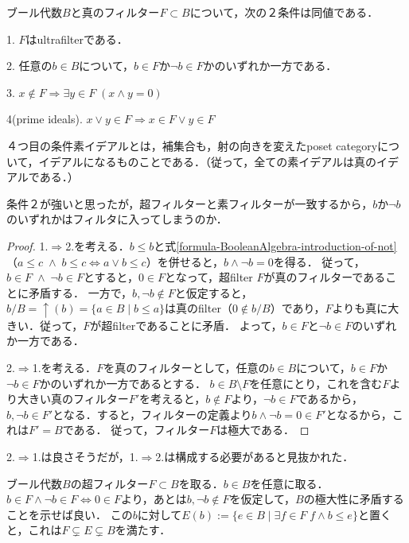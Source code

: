 \documentclass[uplatex, 12pt, dvipdfmx]{jsarticle}
\begin{document}
\begin{proposition*}[ブール代数上のultrafilterの同値な条件]
    ブール代数$B$と真のフィルター$F\subset B$について，次の２条件は同値である．

    1. $F$はultrafilterである．

    2. 任意の$b\in B$について，$b\in F$か$\lnot b\in F$かのいずれか一方である．

    3. $x\notin F\Rightarrow \exists y\in F\; (x\land y=0)$

    4(prime ideals). $x\lor y\in F \Rightarrow x\in F \lor y\in F$
\end{proposition*}
\begin{remark*}
    ４つ目の条件素イデアルとは，補集合も，射の向きを変えたposet categoryについて，イデアルになるものことである．（従って，全ての素イデアルは真のイデアルである．）

    条件２が強いと思ったが，超フィルターと素フィルターが一致するから，$b$か$\lnot b$のいずれかはフィルタに入ってしまうのか．
\end{remark*}
\begin{proof}
    1.$\Rightarrow$2.を考える．$b\le b$と式\ref{formula-BooleanAlgebra-introduction-of-not}（$a\le c\;\land\; b\le c\Leftrightarrow a\lor b\le c$）を併せると，$b\land\lnot b=0$を得る．
    従って，$b\in F\;\land\; \lnot b\in F$とすると，$0\in F$となって，超filter $F$が真のフィルターであることに矛盾する．
    一方で，$b,\lnot b\notin F$と仮定すると，$b/B=\uparrow (b)=\{a\in B\mid b\le a\}$は真のfilter（$0\notin b/B$）であり，$F$よりも真に大きい．従って，$F$が超filterであることに矛盾．
    よって，$b\in F$と$\lnot b\in F$のいずれか一方である．
    
    2.$\Rightarrow$1.を考える．$F$を真のフィルターとして，任意の$b\in B$について，$b\in F$か$\lnot b\in F$かのいずれか一方であるとする．
    $b\in B\setminus F$を任意にとり，これを含む$F$より大きい真のフィルター$F'$を考えると，$b\notin F$より，$\lnot b\in F$であるから，$b,\lnot b\in F'$となる．すると，フィルターの定義より$b\land \lnot b=0\in F'$となるから，これは$F'=B$である．
    従って，フィルター$F$は極大である．
\end{proof}
\begin{remark*}
    2.$\Rightarrow$1.は良さそうだが，1.$\Rightarrow$2.は構成する必要があると見抜かれた．

    ブール代数$B$の超フィルター$F\subset B$を取る．$b\in B$を任意に取る．$b\in F\land\lnot b\in F\Leftrightarrow 0\in F$より，あとは$b,\lnot b\notin F$を仮定して，$B$の極大性に矛盾することを示せば良い．
    この$b$に対して$E(b):=\{e\in B\mid\exists f\in F\;f\land b\le e\}$と置くと，これは$F\subsetneq E\subsetneq B$を満たす．
\end{remark*}
\end{document}
